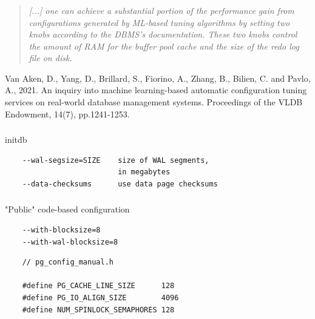 \documentclass[usenames,dvipsnames, 18pt, compress, aspectratio=169]{beamer}
\begin{document}
\begin{frame}[fragile]{}
    \frametitle{}
    \begin{center}

        \blockquote{\it
			[...] one can achieve a substantial portion of the performance gain
			from configurations generated by ML-based tuning algorithms by
			setting two knobs according to the DBMS's documentation. These two
			knobs control the amount of RAM for the buffer pool cache
			and the size of the redo log file on disk.
		}

    \linespread{0.5}
    \vspace{0.5cm}
    \color{black}\fontsize{6pt}{0}\selectfont
		Van Aken, D., Yang, D., Brillard, S., Fiorino, A., Zhang, B., Bilien,
		C. and Pavlo, A., 2021. An inquiry into machine learning-based
		automatic configuration tuning services on real-world database
		management systems. Proceedings of the VLDB Endowment, 14(7),
		pp.1241-1253.
    \linespread{1.5}

    \end{center}
\end{frame}

\begin{frame}[fragile]{}
    \frametitle{}
    \begin{center}

        initdb

		\vspace{0.5cm}
        \begin{verbatim}
    --wal-segsize=SIZE    size of WAL segments,
                          in megabytes
    --data-checksums      use data page checksums
        \end{verbatim}

    \end{center}
\end{frame}

\begin{frame}[fragile]{}
    \frametitle{}
    \begin{center}

        "Public" code-based configuration
		\vspace{0.5cm}
        \begin{verbatim}
    --with-blocksize=8
    --with-wal-blocksize=8
        \end{verbatim}
        \begin{verbatim}
    // pg_config_manual.h

    #define PG_CACHE_LINE_SIZE      128
    #define PG_IO_ALIGN_SIZE        4096
    #define NUM_SPINLOCK_SEMAPHORES 128

        \end{verbatim}

    \end{center}
\end{frame}
\end{document}
